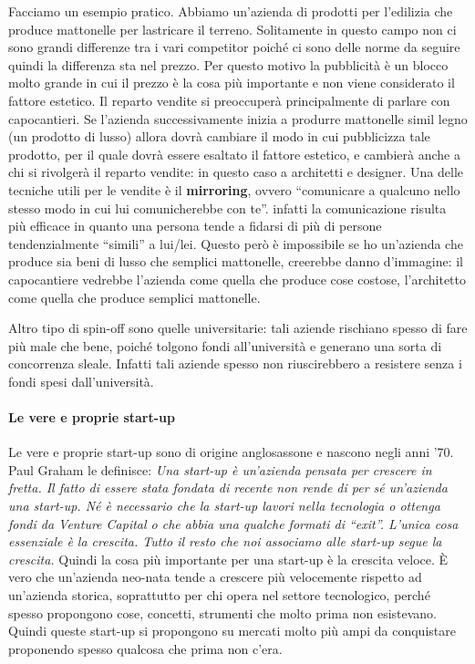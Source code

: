 Facciamo un esempio pratico. Abbiamo un'azienda di prodotti per l'edilizia che
produce mattonelle per lastricare il terreno. Solitamente in questo campo non
ci sono grandi differenze tra i vari competitor poiché ci sono delle norme da
seguire quindi la differenza sta nel prezzo. Per questo motivo la pubblicità è
un blocco molto grande in cui il prezzo è la cosa più importante e non viene
considerato il fattore estetico. Il reparto vendite si preoccuperà
principalmente di parlare con capocantieri. Se l'azienda successivamente inizia
a produrre mattonelle simil legno (un prodotto di lusso) allora dovrà cambiare
il modo in cui pubblicizza tale prodotto, per il quale dovrà essere esaltato il
fattore estetico, e cambierà anche a chi si rivolgerà il reparto vendite: in
questo caso a architetti e designer. Una delle tecniche utili per le vendite è
il \textbf{mirroring}, ovvero ``comunicare a qualcuno nello stesso modo in cui
lui comunicherebbe con te''. infatti la comunicazione risulta più efficace in
quanto una persona tende a fidarsi di più di persone tendenzialmente ``simili''
a lui/lei. Questo però è impossibile se ho un'azienda che produce sia beni di
lusso che semplici mattonelle, creerebbe danno d'immagine: il capocantiere
vedrebbe l'azienda come quella che produce cose costose, l'architetto come
quella che produce semplici mattonelle.

Altro tipo di spin-off sono quelle universitarie: tali aziende rischiano spesso
di fare più male che bene, poiché tolgono fondi all'università e generano una
sorta di concorrenza sleale. Infatti tali aziende spesso non riuscirebbero a
resistere senza i fondi spesi dall'università.

\paragraph*{Le vere e proprie start-up} Le vere e proprie start-up sono di
origine anglosassone e nascono negli anni '70. Paul Graham le definisce:
\emph{
Una start-up è un'azienda pensata per crescere in fretta. Il fatto di essere
stata fondata di recente non rende di per sé un'azienda una start-up. Né è
necessario che la start-up lavori nella tecnologia o ottenga fondi da Venture
Capital o che abbia una qualche formati di ``exit''. L'unica cosa essenziale è
la crescita. Tutto il resto che noi associamo alle start-up segue la crescita.
}
Quindi la cosa più importante per una start-up è la crescita veloce. 
È vero che un'azienda neo-nata tende a crescere più velocemente rispetto ad
un'azienda storica, soprattutto per chi opera nel settore tecnologico, perché
spesso propongono cose, concetti, strumenti che molto prima non esistevano.
Quindi queste start-up si propongono su mercati molto più ampi da conquistare
proponendo spesso qualcosa che prima non c'era.

